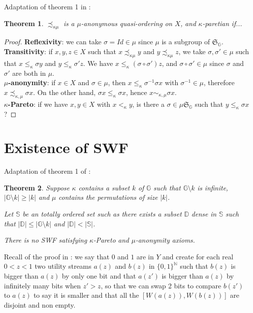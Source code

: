 \documentclass{article}
\newcommand{\G}{\mathbb{G}}
\newtheorem{theorem}{Theorem}
\begin{document}
Adaptation of theorem 1 in \cite{svensson80}:
\begin{theorem}
    $\precsim_{\kappa\mu}$ is a $\mu$-anonymous quasi-ordering on $X$, and
    $\kappa$-paretian if...
\end{theorem}
\begin{proof}
    \textbf{Reflexivity}: we can take $\sigma = Id\in\mu$ since $\mu$ is a
    subgroup of $\mathfrak{S}_\G$.\\
    \textbf{Transitivity}: if $x,y,z\in X$ such that $x \precsim_{\kappa\mu} y$ and 
    $y \precsim_{\kappa\mu} z$,
    we take $\sigma,\sigma'\in \mu$ such that $x\leq_\kappa \sigma y$ and
    $y\leq_\kappa \sigma' z$. We have $x\leq_\kappa (\sigma\circ\sigma')z$,
    and $\sigma\circ\sigma'\in\mu$ since $\sigma$ and $\sigma'$ are both in $\mu$.\\
    \textbf{$\mu$-anonymity}: if $x\in X$ and $\sigma\in\mu$, then
    $x\leq_\kappa\sigma^{-1}\sigma x$ with $\sigma^{-1}\in\mu$,
    therefore $x \precsim_{\kappa,\mu} \sigma x$. On the other hand,
    $\sigma x \leq_{\kappa}\sigma x$, hence $x \sim_{\kappa, \mu}\sigma x$.\\
    \textbf{$\kappa$-Pareto}: if we have $x,y\in X$ with $x<_\kappa y$, is there a
    $\sigma\in \mu\mathfrak{S}_\G$ such that $y\leq_\kappa \sigma x$? 
\end{proof}

\section{Existence of SWF}

Adaptation of theorem 1 of \cite{basumitra03}:
\begin{theorem}
  Suppose $\kappa$ contains a subset $k$ of $\mathbb G$ such that $\mathbb G\setminus k$ is infinite, $|\mathbb G\setminus k|\geq |k|$ and $\mu$ contains the permutations of size $|k|$.

  Let $\mathbb S$ be an totally ordered set such as there exists a subset $\mathbb D$ dense in $\mathbb S$ such that $|\mathbb D|\leq |\mathbb G\setminus k|$ and $|\mathbb D|<|\mathbb S|$.

  There is no SWF satisfying $\kappa$-Pareto and $\mu$-anonymity axioms.
\end{theorem}

Recall of the proof in \cite{basumitra03} : we say that $0$ and $1$ are in $Y$ and
create for each real $0<z<1$ two utility streams $a(z)$ and $b(z)$ in
$\{0,1\}^{\mathbb N}$ such that $b(z)$ is bigger than $a(z)$ by only one bit and
that $a(z')$ is bigger than $a(z)$ by infinitely many bits when $z'>z$, so that we
can swap 2 bits to compare $b(z')$ to $a(z)$ to say it is smaller and that all the
$[W(a(z)),W(b(z))]$ are disjoint and non empty.
\end{document}
